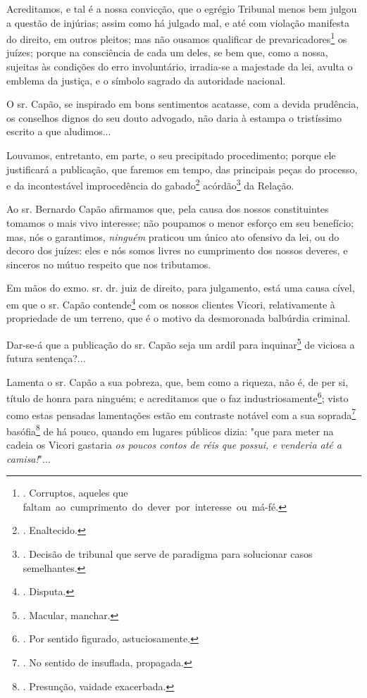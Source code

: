 Acreditamos, e tal é a nossa convicção, que o egrégio Tribunal menos bem
julgou a questão de injúrias; assim como há julgado mal, e até com
violação manifesta do direito, em outros pleitos; mas não ousamos
qualificar de prevaricadores\footnote{. Corruptos, aqueles que
  faltam~ao~cumprimento~do~dever~por~interesse~ou~má-fé.} os juízes;
porque na consciência de cada um deles, se bem que, como a nossa,
sujeitas às condições do erro involuntário, irradia-se a majestade da
lei, avulta o emblema da justiça, e o símbolo sagrado da autoridade
nacional.

O sr. Capão, se inspirado em bons sentimentos acatasse, com a devida
prudência, os conselhos dignos do seu douto advogado, não daria à
estampa o tristíssimo escrito a que aludimos...

Louvamos, entretanto, em parte, o seu precipitado procedimento; porque
ele justificará a publicação, que faremos em tempo, das principais peças
do processo, e da incontestável improcedência do gabado\footnote{.
  Enaltecido.} acórdão\footnote{. Decisão de tribunal que serve de
  paradigma para solucionar casos semelhantes.} da Relação.

Ao sr. Bernardo Capão afirmamos que, pela causa dos nossos constituintes
tomamos o mais vivo interesse; não poupamos o menor esforço em seu
benefício; mas, nós o garantimos, \emph{ninguém} praticou um único ato
ofensivo da lei, ou do decoro dos juízes: eles e nós somos livres no
cumprimento dos nossos deveres, e sinceros no mútuo respeito que nos
tributamos.

Em mãos do exmo. sr. dr. juiz de direito, para julgamento, está uma
causa cível, em que o sr. Capão contende\footnote{. Disputa.} com os
nossos clientes Vicori, relativamente à propriedade de um terreno, que é
o motivo da desmoronada balbúrdia criminal.

Dar-se-á que a publicação do sr. Capão seja um ardil para
inquinar\footnote{. Macular, manchar.} de viciosa a futura sentença?...

Lamenta o sr. Capão a sua pobreza, que, bem como a riqueza, não é, de
per si, título de honra para ninguém; e acreditamos que o faz
industriosamente\footnote{. Por sentido figurado, astuciosamente.};
visto como estas pensadas lamentações estão em contraste notável com a
sua soprada\footnote{. No sentido de insuflada, propagada.}
basófia\footnote{. Presunção, vaidade exacerbada.} de há pouco, quando
em lugares públicos dizia: "que para meter na cadeia os Vicori gastaria
\emph{os poucos contos de réis que possui, e venderia até a camisa!}"...

